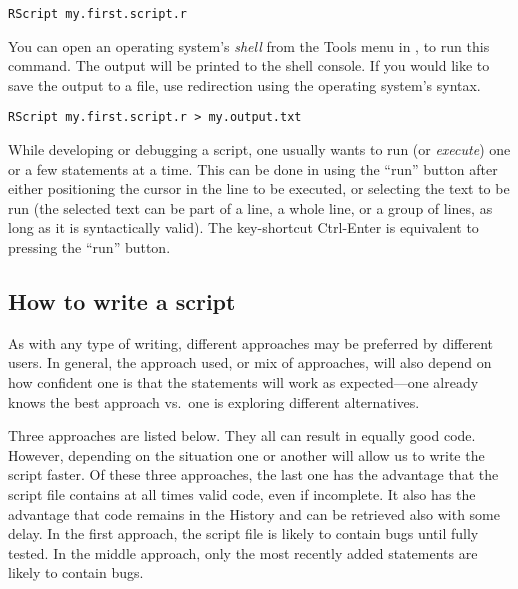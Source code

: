 \begin{shaded}
\footnotesize
\begin{verbatim}
RScript my.first.script.r
\end{verbatim}
\end{shaded}

You can open an operating system's \emph{shell} from the Tools menu in \RStudio, to run this command. The output will be printed to the shell console. If you would like to save the output to a file, use redirection using the operating system's syntax.

\begin{shaded}
\footnotesize
\begin{verbatim}
RScript my.first.script.r > my.output.txt
\end{verbatim}
\end{shaded}

While developing or debugging a script, one usually wants to run (or \emph{execute}) one or a few statements at a time. This can be done in \RStudio using the ``run'' button after either positioning the cursor in the line to be executed, or selecting the text to be run (the selected text can be part of a line, a whole line, or a group of lines, as long as it is syntactically valid). The key-shortcut Ctrl-Enter is equivalent to pressing the ``run'' button.

\subsection{How to write a script}\label{sec:script:writing}

As with any type of writing, different approaches may be preferred by different \Rlang users. In general, the approach used, or mix of approaches, will also depend on how confident one is that the statements will work as expected---one already knows the best approach vs.\ one is exploring different alternatives.

Three approaches are listed below. They all can result in equally good code. However, depending on the situation one or another will allow us to write the script faster. Of these three approaches, the last one has the advantage that the script file contains at all times valid \Rlang code, even if incomplete.  It also has the advantage that code remains in the History and can be retrieved also with some delay. In the first approach, the script file is likely to contain bugs until fully tested. In the middle approach, only the most recently added statements are likely to contain bugs.

